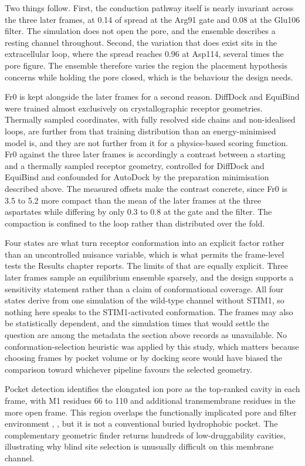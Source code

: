 Two things follow. First, the conduction pathway itself is nearly invariant across the three later frames, at 0.14\angstrom{} of spread at the Arg91 gate and 0.08\angstrom{} at the Glu106 filter. The simulation does not open the pore, and the ensemble describes a resting channel throughout. Second, the variation that does exist sits in the extracellular loop, where the spread reaches 0.96\angstrom{} at Asp114, several times the pore figure. The ensemble therefore varies the region the placement hypothesis concerns while holding the pore closed, which is the behaviour the design needs.

Fr0 is kept alongside the later frames for a second reason. DiffDock and EquiBind were trained almost exclusively on crystallographic receptor geometries. Thermally sampled coordinates, with fully resolved side chains and non-idealised loops, are further from that training distribution than an energy-minimised model is, and they are not further from it for a physics-based scoring function. Fr0 against the three later frames is accordingly a contrast between a starting and a thermally sampled receptor geometry, controlled for DiffDock and EquiBind and confounded for AutoDock by the preparation minimisation described above. The measured offsets make the contrast concrete, since Fr0 is 3.5 to 5.2\angstrom{} more compact than the mean of the later frames at the three aspartates while differing by only 0.3 to 0.8\angstrom{} at the gate and the filter. The compaction is confined to the loop rather than distributed over the fold.

Four states are what turn receptor conformation into an explicit factor rather than an uncontrolled nuisance variable, which is what permits the frame-level tests the Results chapter reports. The limits of that are equally explicit. Three later frames sample an equilibrium ensemble sparsely, and the design supports a sensitivity statement rather than a claim of conformational coverage. All four states derive from one simulation of the wild-type channel without STIM1, so nothing here speaks to the STIM1-activated conformation. The frames may also be statistically dependent, and the simulation times that would settle the question are among the metadata the section above records as unavailable. No conformation-selection heuristic was applied by this study, which matters because choosing frames by pocket volume or by docking score would have biased the comparison toward whichever pipeline favours the selected geometry.

Pocket detection identifies the elongated ion pore as the top-ranked cavity in each frame, with M1 residues 66 to 110 and additional transmembrane residues in the more open frame. This region overlaps the functionally implicated pore and filter environment \cite{ref070}, \cite{ref071}, but it is not a conventional buried hydrophobic pocket. The complementary geometric finder returns hundreds of low-druggability cavities, illustrating why blind site selection is unusually difficult on this membrane channel.

